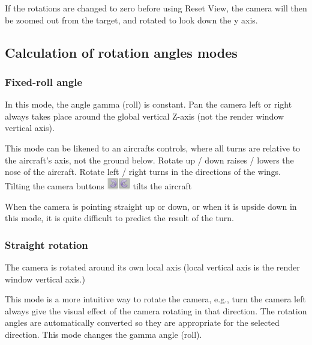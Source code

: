 If the rotations are changed to zero before using Reset View, the camera will
then be zoomed out from the target, and rotated to look down the y axis.

\subsection{Calculation of rotation angles
	modes}\label{calculation-of-rotation-angles-modes}

\subsubsection{Fixed-roll angle}\label{fixed-roll-angle}

In this mode, the angle gamma (roll) is constant. Pan the camera left or right
always takes place around the global vertical Z-axis (not the render window
vertical axis).

This mode can be likened to an aircrafts controls, where all turns are relative
to the aircraft's axis, not the ground below. Rotate up / down raises / lowers
the nose of the aircraft. Rotate left / right turns in the directions of the
wings. Tilting the camera buttons
\includegraphics[width=0.20000in,height=0.20000in]{img/manual/media/button_roll_left.png}\includegraphics[width=0.20000in,height=0.20000in]{img/manual/media/button_roll_right.png}
tilts the aircraft

When the camera is pointing straight up or down, or when it is upside down in
this mode, it is quite difficult to predict the result of the turn.

\subsubsection{Straight rotation}\label{straight-rotation}

The camera is rotated around its own local axis (local vertical axis is the
render window vertical axis.)

This mode is a more intuitive way to rotate the camera, e.g., turn the camera
left always give the visual effect of the camera rotating in that direction. The
rotation angles are automatically converted so they are appropriate for the
selected direction. This mode changes the gamma angle (roll).


